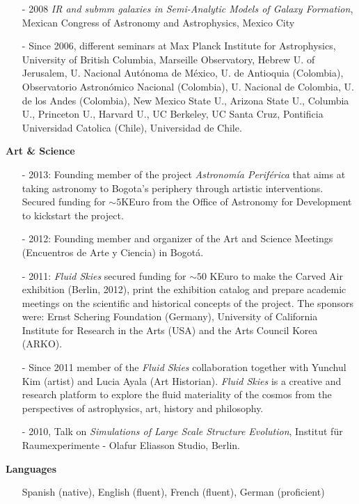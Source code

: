 \documentclass[letterpaper,11pt,onecolumn]{article}
\begin{document}
\begin{itemize}
\item [-] 2008 {\it IR and submm galaxies in Semi-Analytic Models of
  Galaxy Formation}, Mexican Congress of Astronomy and Astrophysics,
  Mexico City 
\item [-] Since 2006, different seminars at Max Planck Institute for
  Astrophysics, University of British Columbia, Marseille Observatory,
  Hebrew U. of Jerusalem, U. Nacional Aut\'onoma de M\'exico, U. de
  Antioquia (Colombia), Observatorio Astron\'omico Nacional
  (Colombia), U. Nacional de Colombia, U. de los Andes (Colombia), New
  Mexico State U., Arizona State U., Columbia U., Princeton U.,
  Harvard U., UC Berkeley, UC Santa Cruz, Pontificia Universidad
  Catolica (Chile), Universidad de Chile. 
\end{itemize}


{\bf Art \& Science}
\begin{itemize}
\item [-] 2013: Founding member of the project \emph{Astronom\'ia
  Perif\'erica} that aims at taking astronomy to Bogota's periphery
  through artistic interventions.  Secured funding for $\sim 5$KEuro
  from the Office of Astronomy for Development to kickstart the
  project. 
\item [-] 2012: Founding member and organizer of the Art and Science Meetings (Encuentros de Arte y Ciencia) in Bogot\'a.
\item [-] 2011: {\it Fluid Skies} secured funding for $\sim 50$ KEuro
  to make the Carved Air exhibition (Berlin, 2012), print the
  exhibition catalog and prepare academic meetings on the scientific
  and historical concepts of the project. The sponsors were: Ernst
  Schering Foundation (Germany), University of California Institute
  for Research in the Arts (USA) and the Arts Council Korea (ARKO).  
\item [-] Since 2011 member of the {\it Fluid Skies} collaboration
  together with Yunchul Kim (artist) and Lucia Ayala (Art
  Historian). {\it Fluid Skies} is a creative and research platform to
  explore the fluid materiality of the cosmos from the perspectives of
  astrophysics, art, history and philosophy. 
\item [-] 2010, Talk on {\it Simulations of Large Scale Structure
  Evolution}, Institut f\"ur Raumexperimente - Olafur Eliasson Studio,
  Berlin.  
\end{itemize}


{\bf Languages}
\begin{itemize}
\item[]Spanish (native), English (fluent), French (fluent), German (proficient)
\end{itemize}

\end{document}
